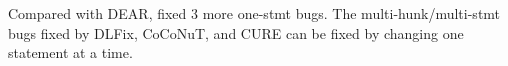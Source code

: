 Compared with DEAR, {\tool} fixed 3 more one-stmt bugs. The
multi-hunk/multi-stmt bugs fixed by DLFix, CoCoNuT, and CURE
can be fixed by changing one statement at a time.



